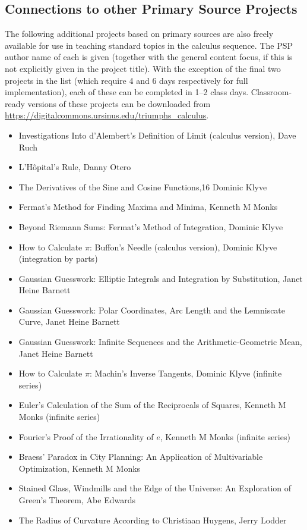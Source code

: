 \documentclass[11pt]{article}%
\begin{document}
 \vspace*{-6pt}
\subsection*{Connections to other Primary Source Projects}

 \vspace*{-3pt}

The following additional projects based on primary sources are also freely available for use in teaching
standard topics in the calculus sequence. The PSP author name of each is given (together with the
general content focus, if this is not explicitly given in the project title). With the exception of the
final two projects in the list (which require 4 and 6 days respectively for full implementation), each
of these can be completed in 1--2 class days. Classroom-ready versions of these projects can be
downloaded from \url{https://digitalcommons.ursinus.edu/triumphs_calculus}.

\begin{itemize}
\setlength\itemsep{-3pt}
\item Investigations Into d’Alembert’s Definition of Limit (calculus version), Dave Ruch
\item L’H\^{o}pital’s Rule, Danny Otero
\item The Derivatives of the Sine and Cosine Functions,16 Dominic Klyve
\item Fermat’s Method for Finding Maxima and Minima, Kenneth M Monks
\item Beyond Riemann Sums: Fermat’s Method of Integration, Dominic Klyve
\item How to Calculate $\pi$: Buffon’s Needle (calculus version), Dominic Klyve (integration by parts)
\item Gaussian Guesswork: Elliptic Integrals and Integration by Substitution, Janet Heine Barnett
\item Gaussian Guesswork: Polar Coordinates, Arc Length and the Lemniscate Curve, Janet Heine
Barnett
\item Gaussian Guesswork: Infinite Sequences and the Arithmetic-Geometric Mean, Janet Heine
Barnett
\item How to Calculate $\pi$: Machin’s Inverse Tangents, Dominic Klyve (infinite series)
\item Euler’s Calculation of the Sum of the Reciprocals of Squares, Kenneth M Monks (infinite series)
\item Fourier’s Proof of the Irrationality of $e$, Kenneth M Monks (infinite series)
\item Braess’ Paradox in City Planning: An Application of Multivariable Optimization, Kenneth M
Monks
\item Stained Glass, Windmills and the Edge of the Universe: An Exploration of Green’s Theorem,
Abe Edwards
\item The Radius of Curvature According to Christiaan Huygens, Jerry Lodder
\end{itemize}
\end{document}
